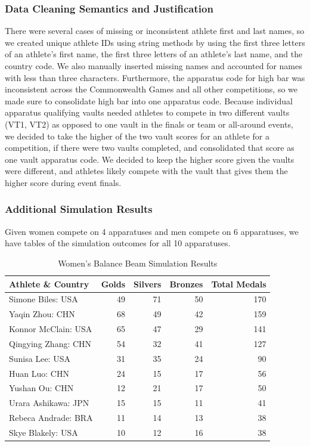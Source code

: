 \documentclass[
  10.5pt,
  letterpaper,
  DIV=11,
  numbers=noendperiod]{scrartcl}
\begin{document}
\hypertarget{data-cleaning-semantics-and-justification}{%
\subsubsection{Data Cleaning Semantics and
Justification}\label{data-cleaning-semantics-and-justification}}

There were several cases of missing or inconsistent athlete first and
last names, so we created unique athlete IDs using string methods by
using the first three letters of an athlete's first name, the first
three letters of an athlete's last name, and the country code. We also
manually inserted missing names and accounted for names with less than
three characters. Furthermore, the apparatus code for high bar was
inconsistent across the Commonwealth Games and all other competitions,
so we made sure to consolidate high bar into one apparatus code. Because
individual apparatus qualifying vaults needed athletes to compete in two
different vaults (VT1, VT2) as opposed to one vault in the finals or
team or all-around events, we decided to take the higher of the two
vault scores for an athlete for a competition, if there were two vaults
completed, and consolidated that score as one vault apparatus code. We
decided to keep the higher score given the vaults were different, and
athletes likely compete with the vault that gives them the higher score
during event finals.

\hypertarget{additional-simulation-results}{%
\subsubsection{Additional Simulation
Results}\label{additional-simulation-results}}

Given women compete on 4 apparatuses and men compete on 6 apparatuses,
we have tables of the simulation outcomes for all 10 apparatuses.

\begin{table}[H]

\caption{Women's Balance Beam Simulation Results }
\centering
\fontsize{8}{10}\selectfont
\begin{tabular}[t]{l|r|r|r|r}
\hline
Athlete \& Country & Golds & Silvers & Bronzes & Total Medals\\
\hline
Simone Biles: USA & 49 & 71 & 50 & 170\\
\hline
Yaqin Zhou: CHN & 68 & 49 & 42 & 159\\
\hline
Konnor McClain: USA & 65 & 47 & 29 & 141\\
\hline
Qingying Zhang: CHN & 54 & 32 & 41 & 127\\
\hline
Sunisa Lee: USA & 31 & 35 & 24 & 90\\
\hline
Huan Luo: CHN & 24 & 15 & 17 & 56\\
\hline
Yushan Ou: CHN & 12 & 21 & 17 & 50\\
\hline
Urara Ashikawa: JPN & 15 & 15 & 11 & 41\\
\hline
Rebeca Andrade: BRA & 11 & 14 & 13 & 38\\
\hline
Skye Blakely: USA & 10 & 12 & 16 & 38\\
\hline
\end{tabular}
\end{table}
\end{document}
